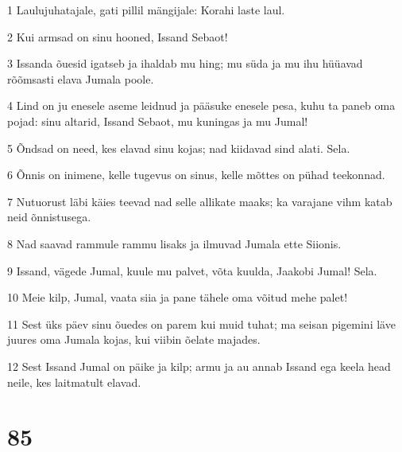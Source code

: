 \par 1 Laulujuhatajale, gati pillil mängijale: Korahi laste laul.
\par 2 Kui armsad on sinu hooned, Issand Sebaot!
\par 3 Issanda õuesid igatseb ja ihaldab mu hing; mu süda ja mu ihu hüüavad rõõmsasti elava Jumala poole.
\par 4 Lind on ju enesele aseme leidnud ja pääsuke enesele pesa, kuhu ta paneb oma pojad: sinu altarid, Issand Sebaot, mu kuningas ja mu Jumal!
\par 5 Õndsad on need, kes elavad sinu kojas; nad kiidavad sind alati. Sela.
\par 6 Õnnis on inimene, kelle tugevus on sinus, kelle mõttes on pühad teekonnad.
\par 7 Nutuorust läbi käies teevad nad selle allikate maaks; ka varajane vihm katab neid õnnistusega.
\par 8 Nad saavad rammule rammu lisaks ja ilmuvad Jumala ette Siionis.
\par 9 Issand, vägede Jumal, kuule mu palvet, võta kuulda, Jaakobi Jumal! Sela.
\par 10 Meie kilp, Jumal, vaata siia ja pane tähele oma võitud mehe palet!
\par 11 Sest üks päev sinu õuedes on parem kui muid tuhat; ma seisan pigemini läve juures oma Jumala kojas, kui viibin õelate majades.
\par 12 Sest Issand Jumal on päike ja kilp; armu ja au annab Issand ega keela head neile, kes laitmatult elavad.

\chapter{85}

